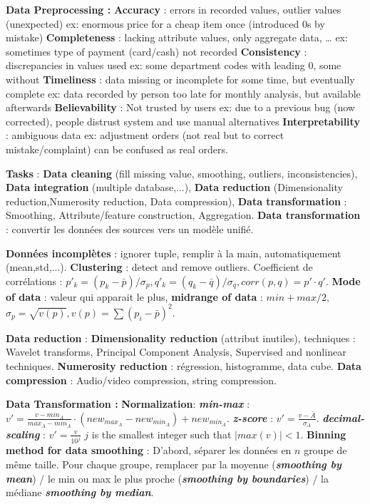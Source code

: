 \documentclass[9pt,a4paper]{report}
\author{Sylvain Julmy}
\begin{document}
\textbf{Data Preprocessing :}
\textbf{Accuracy} : errors in recorded values, outlier values (unexpected) ex: enormous price for a cheap item once (introduced 0s by mistake)
\textbf{Completeness} : lacking attribute values, only aggregate data, … ex: sometimes type of payment (card/cash) not recorded
\textbf{Consistency} : discrepancies in values used ex: some department codes with leading 0, some without
\textbf{Timeliness} : data missing or incomplete for some time, but eventually complete ex: data recorded by person too late for monthly analysis, but available afterwards
\textbf{Believability} : Not trusted by users ex: due to a previous bug (now corrected), people distrust system and use manual alternatives
\textbf{Interpretability} : ambiguous data ex: adjustment orders (not real but to correct mistake/complaint) can be confused as real orders.

\textbf{Tasks} : \textbf{Data cleaning} (fill missing value, smoothing, outliers, inconsistencies), \textbf{Data integration} (multiple database,...), \textbf{Data reduction} (Dimensionality reduction,Numerosity reduction, Data compression), \textbf{Data transformation} : Smoothing, Attribute/feature construction, Aggregation. \textbf{Data transformation} : convertir les données des sources vers un modèle unifié.

\textbf{Données incomplètes} : ignorer tuple, remplir à la main, automatiquement (mean,std,...). \textbf{Clustering} : detect and remove outliers. Coefficient de corrélations : $p'_k = (p_k-\bar{p})/\sigma_p, q'_k = (q_k-\bar{q})/\sigma_q, corr(p,q)=p'\cdot q'$. \textbf{Mode of data} : valeur qui apparait le plus, \textbf{midrange of data} : $min + max / 2$, $\sigma_p=\sqrt{v(p)}, v(p)=\sum (p_i-\bar{p})^2$.

\textbf{Data reduction} : \textbf{Dimensionality reduction} (attribut inutiles), techniques : Wavelet transforms, Principal Component Analysis, Supervised and nonlinear techniques. \textbf{Numerosity reduction} : régression, histogramme, data cube. \textbf{Data compression} : Audio/video compression, string compression.

\textbf{Data Transformation :} \textbf{Normalization}: \textit{\textbf{min-max}} : $v'=\frac{v - min_A}{max_A - min_A}\cdot (new_{max_A} - new_{min_A})+new_{min_A}$. \textit{\textbf{z-score}} : $v'=\frac{v-\bar{A}}{\sigma_A}$. \textit{\textbf{decimal-scaling}} : $v'=\frac{v}{10^j}$  $j$ is the smallest integer such that $|max(v)| < 1$. \textbf{Binning method for data smoothing} : D'abord, séparer les données en $n$ groupe de même taille. Pour chaque groupe, remplacer par la moyenne (\textit{\textbf{smoothing by mean}}) / le min ou max le plus proche (\textit{\textbf{smoothing by boundaries}}) / la médiane \textit{\textbf{smoothing by median}}.
\end{document}
